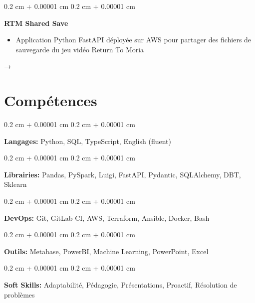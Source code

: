 \documentclass[10pt, letterpaper]{article}
\newenvironment{highlights}{
    \begin{itemize}[
        topsep=0.10 cm,
        parsep=0.10 cm,
        partopsep=0pt,
        itemsep=0pt,
        leftmargin=0.4 cm + 10pt
    ]
}{
    \end{itemize}
} %
\newenvironment{onecolentry}{
    \begin{adjustwidth}{
        0.2 cm + 0.00001 cm
    }{
        0.2 cm + 0.00001 cm
    }
}{
    \end{adjustwidth}
} %
\newenvironment{twocolentry}[2][]{
    \onecolentry
    \def\secondColumn{#2}
    \setcolumnwidth{\fill, 3.5 cm}
    \begin{paracol}{2}
}{
    \switchcolumn \raggedleft \secondColumn
    \end{paracol}
    \endonecolentry
} %
\let\hrefWithoutArrow\href
\renewcommand{\href}[2]{\hrefWithoutArrow{#1}{\ifthenelse{\equal{#2}{}}{ }{#2 }\raisebox{.15ex}{\footnotesize \faExternalLink*}}}
\begin{document}
        \begin{twocolentry}{
            → \href{https://github.com/Evlun1/lotrrtm_shared_save}{GitHub}
        }
            \textbf{RTM Shared Save}
            \begin{highlights}
                \item Application Python FastAPI déployée sur AWS pour partager des fichiers de sauvegarde du jeu vidéo Return To Moria
            \end{highlights}
        \end{twocolentry}



    
    \section{Compétences}



        
        \begin{onecolentry}
            \textbf{Langages:} Python, SQL, TypeScript, English (fluent)
        \end{onecolentry}

        \vspace{0.2 cm}

        \begin{onecolentry}
            \textbf{Librairies:} Pandas, PySpark, Luigi, FastAPI, Pydantic, SQLAlchemy, DBT, Sklearn
        \end{onecolentry}

        \vspace{0.2 cm}

        \begin{onecolentry}
            \textbf{DevOps:} Git, GitLab CI, AWS, Terraform, Ansible, Docker, Bash
        \end{onecolentry}

        \vspace{0.2 cm}

        \begin{onecolentry}
            \textbf{Outils:} Metabase, PowerBI, Machine Learning, PowerPoint, Excel
        \end{onecolentry}

        \vspace{0.2 cm}

        \begin{onecolentry}
            \textbf{Soft Skills:} Adaptabilité, Pédagogie, Présentations, Proactif, Résolution de problèmes
        \end{onecolentry}
\end{document}
